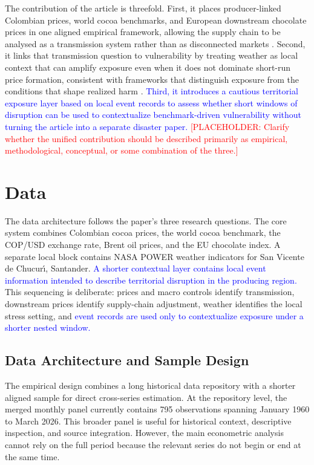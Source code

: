 \documentclass[11pt]{article}
\newcommand{\vTwo}[1]{\textcolor{blue}{#1}}
\newcommand{\placeholder}[1]{\textcolor{red}{[PLACEHOLDER: #1]}}
\begin{document}
The contribution of the article is threefold. First, it places producer-linked Colombian prices, world cocoa benchmarks, and European downstream chocolate prices in one aligned empirical framework, allowing the supply chain to be analysed as a transmission system rather than as disconnected markets \citep{acosta_ihle_voncramon_2019,JimenezRodriguez2022}. Second, it links that transmission question to vulnerability by treating weather as local context that can amplify exposure even when it does not dominate short-run price formation, consistent with frameworks that distinguish exposure from the conditions that shape realized harm \citep{Turner2003,Adger2006}. \vTwo{Third, it introduces a cautious territorial exposure layer based on local event records to assess whether short windows of disruption can be used to contextualize benchmark-driven vulnerability without turning the article into a separate disaster paper.} \placeholder{Clarify whether the unified contribution should be described primarily as empirical, methodological, conceptual, or some combination of the three.}


\section{Data}
\label{sec:data}

The data architecture follows the paper's three research questions. The core system combines Colombian cocoa prices, the world cocoa benchmark, the COP/USD exchange rate, Brent oil prices, and the EU chocolate index. A separate local block contains NASA POWER weather indicators for San Vicente de Chucur\'{\i}, Santander. \vTwo{A shorter contextual layer contains local event information intended to describe territorial disruption in the producing region.} This sequencing is deliberate: prices and macro controls identify transmission, downstream prices identify supply-chain adjustment, weather identifies the local stress setting, and \vTwo{event records are used only to contextualize exposure under a shorter nested window.}

\subsection{Data Architecture and Sample Design}

The empirical design combines a long historical data repository with a shorter aligned sample for direct cross-series estimation. At the repository level, the merged monthly panel currently contains 795 observations spanning January 1960 to March 2026. This broader panel is useful for historical context, descriptive inspection, and source integration. However, the main econometric analysis cannot rely on the full period because the relevant series do not begin or end at the same time.
\end{document}
